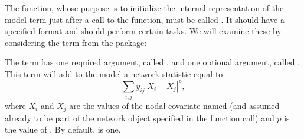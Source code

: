 \documentclass[nojss]{jss}
\begin{document}
The  function, whose purpose is to initialize the internal representation
of the model term  just after a call to the   function,
must be called .  It should have a specified format and should
perform certain tasks.  We will examine these by considering the
 term from the  package:
\begin{CodeChunk}
\end{CodeChunk}
The  term has one required argument, called , and
one optional argument, called .  This term will add to the
model a network statistic equal to
\[
\sum_{i,j} y_{ij} |X_i-X_j|^p,
\]
where $X_i$ and $X_j$ are the values of the nodal covariate named 
(and assumed already to be part of the network object specified in the
 function call) and $p$ is the value of .  By default, 
is one.
\end{document}
